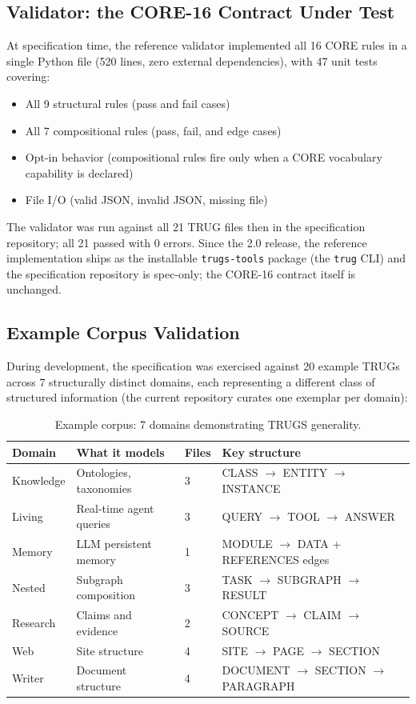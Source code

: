 \documentclass{article}
\begin{document}
\subsection{Validator: the CORE-16 Contract Under Test}

At specification time, the reference validator implemented all 16 CORE rules in a single Python file (520 lines, zero external dependencies), with 47 unit tests covering:

\begin{itemize}
    \item All 9 structural rules (pass and fail cases)
    \item All 7 compositional rules (pass, fail, and edge cases)
    \item Opt-in behavior (compositional rules fire only when a CORE vocabulary capability is declared)
    \item File I/O (valid JSON, invalid JSON, missing file)
\end{itemize}

The validator was run against all 21 TRUG files then in the specification repository; all 21 passed with 0 errors. Since the 2.0 release, the reference implementation ships as the installable \texttt{trugs-tools} package (the \texttt{trug} CLI) and the specification repository is spec-only; the CORE-16 contract itself is unchanged.

\subsection{Example Corpus Validation}

During development, the specification was exercised against 20 example TRUGs across 7 structurally distinct domains, each representing a different class of structured information (the current repository curates one exemplar per domain):

\begin{table}[h]
\centering
\small
\caption{Example corpus: 7 domains demonstrating TRUGS generality.}
\begin{tabular}{llll}
\toprule
\textbf{Domain} & \textbf{What it models} & \textbf{Files} & \textbf{Key structure} \\
\midrule
Knowledge & Ontologies, taxonomies & 3 & CLASS $\to$ ENTITY $\to$ INSTANCE \\
Living & Real-time agent queries & 3 & QUERY $\to$ TOOL $\to$ ANSWER \\
Memory & LLM persistent memory & 1 & MODULE $\to$ DATA + REFERENCES edges \\
Nested & Subgraph composition & 3 & TASK $\to$ SUBGRAPH $\to$ RESULT \\
Research & Claims and evidence & 2 & CONCEPT $\to$ CLAIM $\to$ SOURCE \\
Web & Site structure & 4 & SITE $\to$ PAGE $\to$ SECTION \\
Writer & Document structure & 4 & DOCUMENT $\to$ SECTION $\to$ PARAGRAPH \\
\bottomrule
\end{tabular}
\end{table}
\end{document}
